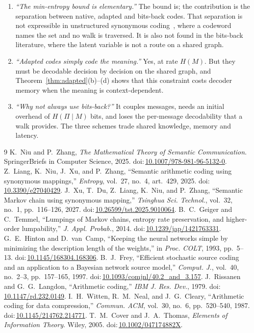\documentclass[11pt]{article}
\newcommand{\doi}[1]{doi:\,\url{#1}}
\theoremstyle{definition}
\theoremstyle{remark}
\begin{document}
\begin{enumerate}
\item \emph{``The min-entropy bound is elementary.''} The bound is; the contribution is the separation between native, adapted and bits-back codes. That separation is not expressible in unstructured synonymous coding~\cite{niu2025,liang2025}, where a codeword names the set and no walk is traversed. It is also not found in the bits-back literature, where the latent variable is not a route on a shared graph.
\item \emph{``Adapted codes simply code the meaning.''} Yes, at rate $H(M)$. But they must be decodable decision by decision on the shared graph, and Theorem~\ref{thm:adapted}(b)--(d) shows that this constraint costs decoder memory when the meaning is context-dependent.
\item \emph{``Why not always use bits-back?''} It couples messages, needs an initial overhead of $H(\Pi\mid M)$ bits, and loses the per-message decodability that a walk provides. The three schemes trade shared knowledge, memory and latency.
\end{enumerate}

\begin{thebibliography}{9}
 K.~Niu and P.~Zhang, \emph{The Mathematical Theory of Semantic Communication}. SpringerBriefs in Computer Science, 2025. \doi{10.1007/978-981-96-5132-0}.
 Z.~Liang, K.~Niu, J.~Xu, and P.~Zhang, ``Semantic arithmetic coding using synonymous mappings,'' \emph{Entropy}, vol.~27, no.~4, art.~429, 2025. \doi{10.3390/e27040429}.
 J.~Xu, T.~Du, Z.~Liang, K.~Niu, and P.~Zhang, ``Semantic Markov chain using synonymous mapping,'' \emph{Tsinghua Sci. Technol.}, vol.~32, no.~1, pp.~116--126, 2027. \doi{10.26599/tst.2025.9010064}.
 B.~C.~Geiger and C.~Temmel, ``Lumpings of Markov chains, entropy rate preservation, and higher-order lumpability,'' \emph{J. Appl. Probab.}, 2014. \doi{10.1239/jap/1421763331}.
 G.~E.~Hinton and D.~van~Camp, ``Keeping the neural networks simple by minimizing the description length of the weights,'' in \emph{Proc. COLT}, 1993, pp.~5--13. \doi{10.1145/168304.168306}.
 B.~J.~Frey, ``Efficient stochastic source coding and an application to a Bayesian network source model,'' \emph{Comput. J.}, vol.~40, no.~2--3, pp.~157--165, 1997. \doi{10.1093/comjnl/40.2_and_3.157}.
 J.~Rissanen and G.~G.~Langdon, ``Arithmetic coding,'' \emph{IBM J. Res. Dev.}, 1979. \doi{10.1147/rd.232.0149}.
 I.~H.~Witten, R.~M.~Neal, and J.~G.~Cleary, ``Arithmetic coding for data compression,'' \emph{Commun. ACM}, vol.~30, no.~6, pp.~520--540, 1987. \doi{10.1145/214762.214771}.
 T.~M.~Cover and J.~A.~Thomas, \emph{Elements of Information Theory}. Wiley, 2005. \doi{10.1002/047174882X}.
\end{thebibliography}
\end{document}
